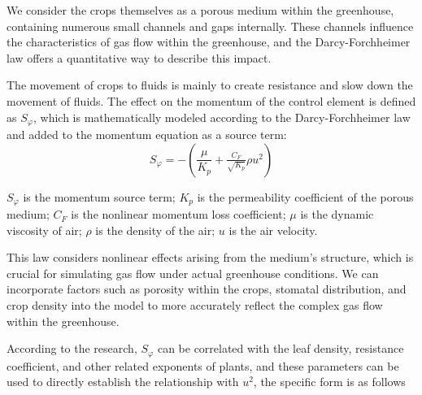 \documentclass{apmcmthesis}
\begin{document}
{We consider the crops themselves as a porous medium within the greenhouse, containing numerous small channels and gaps internally. These channels influence the characteristics of gas flow within the greenhouse, and the Darcy-Forchheimer law offers a quantitative way to describe this impact. 

The movement of crops to fluids is mainly to create resistance and slow down the movement of fluids. The effect on the momentum of the control element is defined as $S_\varphi $, which is mathematically modeled according to the Darcy-Forchheimer law and added to the momentum equation as a source term:
$$ S_\varphi =-\left ( \frac{\mu }{K_p} +\tfrac{C_F}{\sqrt{K_p} } \rho u^2  \right ) $$

$S_\varphi $ is the momentum source term; $K_p$ is the permeability coefficient of the porous medium; $C_F$ is the nonlinear momentum loss coefficient; $\mu$ is the dynamic viscosity of air; $\rho$ is the density of the air; $u$ is the air velocity.

This law considers nonlinear effects arising from the medium's structure, which is crucial for simulating gas flow under actual greenhouse conditions. We can incorporate factors such as porosity within the crops, stomatal distribution, and crop density into the model to more accurately reflect the complex gas flow within the greenhouse.

According to the research, $S_\varphi $ can be correlated with the leaf density, resistance coefficient, and other related exponents of plants, and these parameters can be used to directly establish the relationship with $u^2$, the specific form is as follows

}
\end{document}
